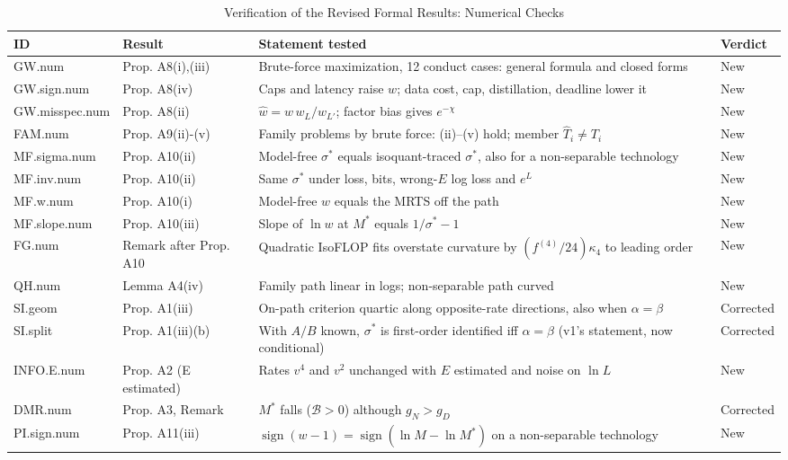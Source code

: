 \begin{table}[tp]
\centering
\caption{Verification of the Revised Formal Results: Numerical Checks}
\label{tab:ra5-claims-num}
\scriptsize
\setlength{\tabcolsep}{4pt}
\begin{tabular}{@{}l >{\raggedright\arraybackslash}p{} >{\raggedright\arraybackslash}p{} l@{}}
\toprule
ID & Result & Statement tested & Verdict \\
\midrule
GW.num & Prop. A8(i),(iii) & Brute-force maximization, 12 conduct cases: general formula and closed forms & New \\
GW.sign.num & Prop. A8(iv) & Caps and latency raise $w$; data cost, cap, distillation, deadline lower it & New \\
GW.misspec.num & Prop. A8(ii) & $\hat w=w\,w_L/w_{L'}$; factor bias gives $e^{-\chi}$ & New \\
FAM.num & Prop. A9(ii)-(v) & Family problems by brute force: (ii)--(v) hold; member $\hat T_i\neq T_i$ & New \\
MF.sigma.num & Prop. A10(ii) & Model-free $\sigma^*$ equals isoquant-traced $\sigma^*$, also for a non-separable technology & New \\
MF.inv.num & Prop. A10(ii) & Same $\sigma^*$ under loss, bits, wrong-$E$ log loss and $e^{L}$ & New \\
MF.w.num & Prop. A10(i) & Model-free $w$ equals the MRTS off the path & New \\
MF.slope.num & Prop. A10(iii) & Slope of $\ln w$ at $M^*$ equals $1/\sigma^*-1$ & New \\
FG.num & Remark after Prop. A10 & Quadratic IsoFLOP fits overstate curvature by $(f^{(4)}/24)\kappa_4$ to leading order & New \\
QH.num & Lemma A4(iv) & Family path linear in logs; non-separable path curved & New \\
SI.geom & Prop. A1(iii) & On-path criterion quartic along opposite-rate directions, also when $\alpha=\beta$ & Corrected \\
SI.split & Prop. A1(iii)(b) & With $A/B$ known, $\sigma^*$ is first-order identified iff $\alpha=\beta$ (v1's statement, now conditional) & Corrected \\
INFO.E.num & Prop. A2 (E estimated) & Rates $v^4$ and $v^2$ unchanged with $E$ estimated and noise on $\ln L$ & New \\
DMR.num & Prop. A3, Remark & $M^*$ falls ($\mathcal B>0$) although $g_N>g_D$ & Corrected \\
PI.sign.num & Prop. A11(iii) & $\operatorname{sign}(w-1)=\operatorname{sign}(\ln M-\ln M^*)$ on a non-separable technology & New \\

\end{tabular}
\end{table}
